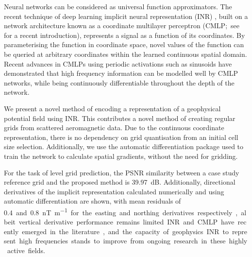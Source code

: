 Neural networks can be considered as universal function approximators.
The recent technique of deep learning implicit neural representation (INR) \parencite{mildenhallNeRFRepresentingScenes2020}, built on a network architecture known as a coordinate multilayer perceptron (CMLP;\ see \textcite{ramasinghePeriodicityUnifyingFramework2022} for a recent introduction), represents a signal as a function of its coordinates.
By parameterising the function in coordinate space, novel values of the function can be queried at arbitrary coordinates within the learned continuous spatial domain.
Recent advances in CMLPs using periodic activations such as sinusoids have demonstrated that high frequency information can be modelled well by CMLP networks, while being continuously differentiable throughout the depth of the network.

We present a novel method of encoding a representation of a geophysical potential field using INR\@.
This contributes a novel method of creating regular grids from scattered aeromagnetic data.
Due to the continuous coordinate representation, there is no dependency on grid quantisation from an initial cell size selection.
Additionally, we use the automatic differentiation package used to train the network to calculate spatial gradients, without the need for gridding.

For the task of level grid prediction, the PSNR similarity between a case study reference grid and the proposed method is \qty{39.97}{\dB}.
Additionally, directional derivatives of the implicit representation calculated numerically and using automatic differentiation are shown, with mean residuals of \qty{0.4} and \qty{0.8}{\nano\tesla\per\m} for the easting and northing derivatives respectively, albeit vertical derivative performance remains limited.

INR and CMLP have recently emerged in the literature, and the capacity of geophysics INR to represent high frequencies stands to improve from ongoing research in these highly active fields.

